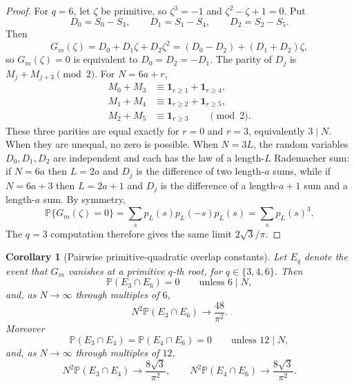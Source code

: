\documentclass[11pt]{amsart}
\numberwithin{equation}{section}
\newtheorem{corollary}[theorem]{Corollary}
\theoremstyle{definition}
\theoremstyle{remark}
\newcommand{\Prob}{\mathbb P}
\begin{document}
\begin{proof}
For \(q=6\), let \(\zeta\) be primitive, so \(\zeta^3=-1\) and
\(\zeta^2-\zeta+1=0\).  Put
\[
  D_0=S_0-S_3,\qquad D_1=S_1-S_4,\qquad D_2=S_2-S_5 .
\]
Then
\[
  G_m(\zeta)=D_0+D_1\zeta+D_2\zeta^2
  =(D_0-D_2)+(D_1+D_2)\zeta,
\]
so \(G_m(\zeta)=0\) is equivalent to \(D_0=D_2=-D_1\).  The parity of \(D_j\) is
\(M_j+M_{j+3}\pmod2\).  For \(N=6a+r\),
\[
\begin{aligned}
  M_0+M_3&\equiv \mathbf1_{r\ge1}+\mathbf1_{r\ge4},\\
  M_1+M_4&\equiv \mathbf1_{r\ge2}+\mathbf1_{r\ge5},\\
  M_2+M_5&\equiv \mathbf1_{r\ge3}
  \qquad\pmod2.
\end{aligned}
\]
These three parities are equal exactly for \(r=0\) and \(r=3\), equivalently
\(3\mid N\).  When they are unequal, no zero is possible.  When \(N=3L\), the
random variables \(D_0,D_1,D_2\) are independent and each has the law of a
length-\(L\) Rademacher sum: if \(N=6a\) then \(L=2a\) and \(D_j\) is the
difference of two length-\(a\) sums, while if \(N=6a+3\) then \(L=2a+1\) and
\(D_j\) is the difference of a length-\(a+1\) sum and a length-\(a\) sum.  By
symmetry,
\[
  \Prob\{G_m(\zeta)=0\}
  =\sum_s p_L(s)p_L(-s)p_L(s)
  =\sum_s p_L(s)^3.
\]
The \(q=3\) computation therefore gives the same limit \(2\sqrt3/\pi\).
\end{proof}

\begin{corollary}[Pairwise primitive-quadratic overlap constants]
\label{cor:rademacher-quadratic-overlaps}
Let \(E_q\) denote the event that \(G_m\) vanishes at a primitive \(q\)-th
root, for \(q\in\{3,4,6\}\).  Then
\[
  \Prob(E_3\cap E_6)=0\qquad\text{unless }6\mid N,
\]
and, as \(N\to\infty\) through multiples of \(6\),
\[
  N^2\Prob(E_3\cap E_6)\longrightarrow \frac{48}{\pi^2}.
\]
Moreover
\[
  \Prob(E_3\cap E_4)=\Prob(E_4\cap E_6)=0
  \qquad\text{unless }12\mid N,
\]
and, as \(N\to\infty\) through multiples of \(12\),
\[
  N^2\Prob(E_3\cap E_4)\longrightarrow \frac{8\sqrt3}{\pi^2},
  \qquad
  N^2\Prob(E_4\cap E_6)\longrightarrow \frac{8\sqrt3}{\pi^2}.
\]
\end{corollary}
\end{document}
